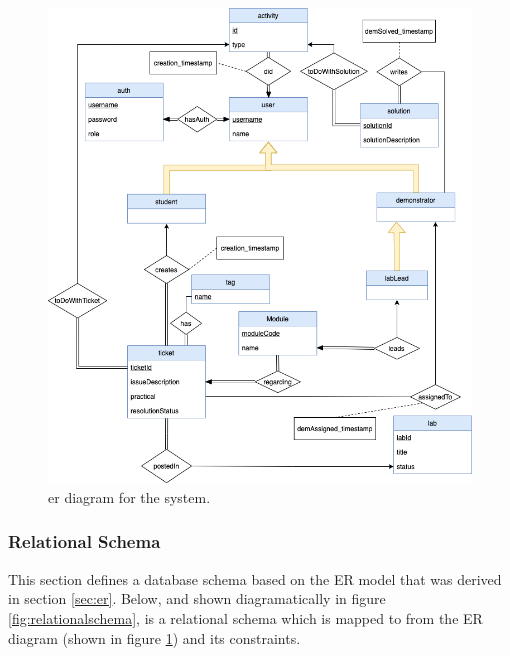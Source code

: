 \begin{figure}[H]
    \centering
    \includegraphics[width=\textwidth]{7design/images/ER.png}
    \caption{\gls{er} diagram for the system.}
    \label{fig:ER}
\end{figure}

\subsubsection{Relational Schema}\label{sec:relschem}

This section defines a database schema based on the ER model that was derived in section \ref{sec:er}. Below, and shown diagramatically in figure \ref{fig:relationalschema}, is a relational schema which is mapped to from the ER diagram (shown in figure \ref{fig:ER}) and its constraints.  


